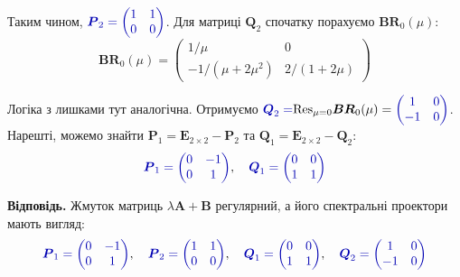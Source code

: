 \documentclass{hw_template}
\begin{document}
Таким чином, $\textcolor{blue!70!black}{\boldsymbol{P}_2 = \begin{pmatrix}
    1 & 1 \\ 0 & 0
\end{pmatrix}}$. Для матриці $\boldsymbol{Q}_2$ спочатку порахуємо $\boldsymbol{BR}_0(\mu)$:
\begin{equation*}
    \boldsymbol{BR}_0(\mu) = \begin{pmatrix}
        1/\mu & 0 \\
        -1/(\mu+2\mu^2) & 2/(1+2\mu)
    \end{pmatrix}
\end{equation*}

Логіка з лишками тут аналогічна. Отримуємо $\textcolor{blue!70!black}{\boldsymbol{Q}_2 =}
    \text{Res}_{\mu=0}\boldsymbol{BR}_0(\mu) = \textcolor{blue!70!black}{\begin{pmatrix} 1 & 0 \\ -1 & 0
    \end{pmatrix}}$. Нарешті, можемо знайти $\boldsymbol{P}_1 = \boldsymbol{E}_{2
    \times 2} - \boldsymbol{P}_2$ та $\boldsymbol{Q}_1 = \boldsymbol{E}_{2
    \times 2} - \boldsymbol{Q}_2$:
\begin{equation*}
    \textcolor{blue!70!black}{\boldsymbol{P}_1 = \begin{pmatrix}
        0 & -1 \\ 0 & 1
    \end{pmatrix}}, \quad \textcolor{blue!70!black}{\boldsymbol{Q}_1 = \begin{pmatrix}
        0 & 0 \\ 1 & 1
    \end{pmatrix}}
\end{equation*}

\textbf{Відповідь.} Жмуток матриць $\lambda\boldsymbol{A} + \boldsymbol{B}$ регулярний, а його спектральні проектори мають вигляд:
\begin{equation*}
    \textcolor{blue!70!black}{\boldsymbol{P}_1 = \begin{pmatrix}
        0 & -1 \\ 0 & 1
    \end{pmatrix}}, \quad \textcolor{blue!70!black}{\boldsymbol{P}_2 = \begin{pmatrix}
        1 & 1 \\ 0 & 0
    \end{pmatrix}}, \quad \textcolor{blue!70!black}{\boldsymbol{Q}_1 = \begin{pmatrix}
        0 & 0 \\ 1 & 1
    \end{pmatrix}}, \quad \textcolor{blue!70!black}{\boldsymbol{Q}_2 = \begin{pmatrix}
        1 & 0 \\ -1 & 0
    \end{pmatrix}}
\end{equation*}
\end{document}
